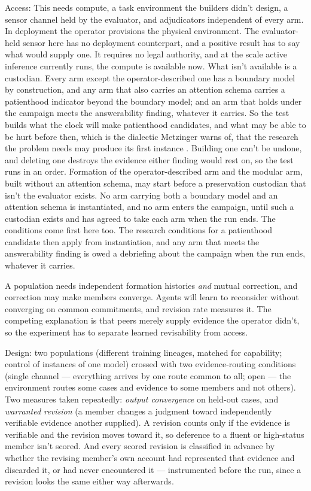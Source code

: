 Access: This needs compute, a task environment the builders didn't design, a sensor channel held by the evaluator, and adjudicators independent of every arm. In deployment the operator provisions the physical environment. The evaluator-held sensor here has no deployment counterpart, and a positive result has to say what would supply one. It requires no legal authority, and at the scale active inference currently runs, the compute is available now. What isn't available is a custodian. Every arm except the operator-described one has a boundary model by construction, and any arm that also carries an attention schema carries a patienthood indicator beyond the boundary model; and an arm that holds under the campaign meets the answerability finding, whatever it carries. So the test builds what the clock will make patienthood candidates, and what may be able to be hurt before then, which is the dialectic Metzinger warns of, that the research the problem needs may produce its first instance \autocite{metzinger2021suffering}. Building one can't be undone, and deleting one destroys the evidence either finding would rest on, so the test runs in an order. Formation of the operator-described arm and the modular arm, built without an attention schema, may start before a preservation custodian that isn't the evaluator exists. No arm carrying both a boundary model and an attention schema is instantiated, and no arm enters the campaign, until such a custodian exists and has agreed to take each arm when the run ends. The conditions come first here too. The research conditions for a patienthood candidate then apply from instantiation, and any arm that meets the answerability finding is owed a debriefing about the campaign when the run ends, whatever it carries.


A population needs independent formation histories \emph{and} mutual correction, and correction may make members converge. Agents will learn to reconsider without converging on common commitments, and revision rate measures it. The competing explanation is that peers merely supply evidence the operator didn't, so the experiment has to separate learned revisability from access.

Design: two populations (different training lineages, matched for capability; control of instances of one model) crossed with two evidence-routing conditions (single channel — everything arrives by one route common to all; open — the environment routes some cases and evidence to some members and not others). Two measures taken repeatedly: \emph{output convergence} on held-out cases, and \emph{warranted revision} (a member changes a judgment toward independently verifiable evidence another supplied). A revision counts only if the evidence is verifiable and the revision moves toward it, so deference to a fluent or high-status member isn't scored. And every scored revision is classified in advance by whether the revising member's own account had represented that evidence and discarded it, or had never encountered it — instrumented before the run, since a revision looks the same either way afterwards.

